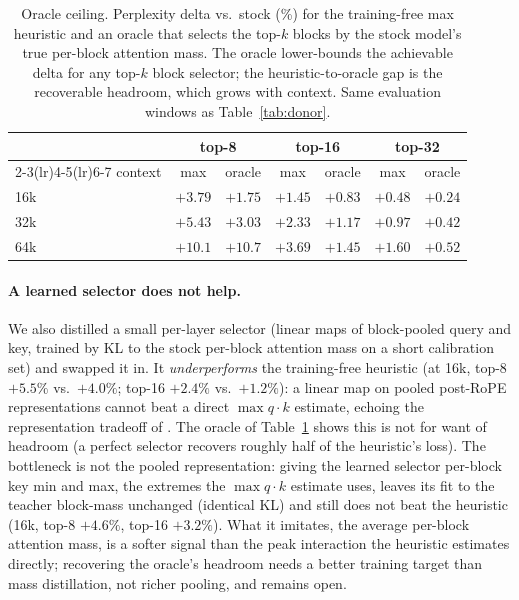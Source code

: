 \documentclass[10pt,letterpaper]{article}
\begin{document}
\begin{table}[h]
\centering
\caption{Oracle ceiling. Perplexity delta vs.\ stock (\%) for the training-free
max heuristic and an oracle that selects the top-$k$ blocks by the stock model's
true per-block attention mass. The oracle lower-bounds the achievable delta for any
top-$k$ block selector; the heuristic-to-oracle gap is the recoverable headroom,
which grows with context. Same evaluation windows as Table~\ref{tab:donor}.}
\label{tab:donor-oracle}
\small
\begin{tabular}{lcccccc}
\toprule
& \multicolumn{2}{c}{top-8} & \multicolumn{2}{c}{top-16} & \multicolumn{2}{c}{top-32} \\
\cmidrule(lr){2-3}\cmidrule(lr){4-5}\cmidrule(lr){6-7}
context & max & oracle & max & oracle & max & oracle \\
\midrule
16k & $+3.79$ & $+1.75$ & $+1.45$ & $+0.83$ & $+0.48$ & $+0.24$ \\
32k & $+5.43$ & $+3.03$ & $+2.33$ & $+1.17$ & $+0.97$ & $+0.42$ \\
64k & $+10.1$ & $+10.7$ & $+3.69$ & $+1.45$ & $+1.60$ & $+0.52$ \\
\bottomrule
\end{tabular}
\end{table}

\paragraph{A learned selector does not help.} We also distilled a small per-layer
selector (linear maps of block-pooled query and key, trained by KL to the stock
per-block attention mass on a short calibration set) and swapped it in. It
\emph{underperforms} the training-free heuristic (at 16k, top-8 $+5.5\%$ vs.\
$+4.0\%$; top-16 $+2.4\%$ vs.\ $+1.2\%$): a linear map on pooled post-RoPE
representations cannot beat a direct $\max q\cdot k$ estimate, echoing the
representation tradeoff of \Cref{sec:centroid}. The oracle of
Table~\ref{tab:donor-oracle} shows this is not for want of headroom (a perfect
selector recovers roughly half of the heuristic's loss). The bottleneck is not the
pooled representation: giving the learned selector per-block key min and max, the
extremes the $\max q\cdot k$ estimate uses, leaves its fit to the teacher
block-mass unchanged (identical KL) and still does not beat the heuristic (16k,
top-8 $+4.6\%$, top-16 $+3.2\%$). What it imitates, the average per-block attention
mass, is a softer signal than the peak interaction the heuristic estimates
directly; recovering the oracle's headroom needs a better training target than mass
distillation, not richer pooling, and remains open.
\end{document}
